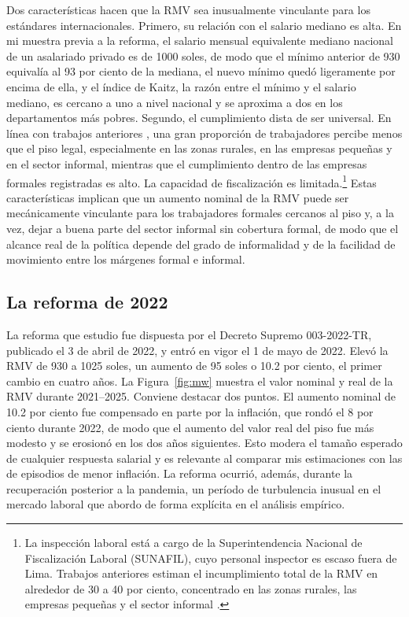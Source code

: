 Dos características hacen que la RMV sea inusualmente vinculante para los estándares internacionales. Primero, su relación con el salario mediano es alta. En mi muestra previa a la reforma, el salario mensual equivalente mediano nacional de un asalariado privado es de 1000 soles, de modo que el mínimo anterior de 930 equivalía al 93 por ciento de la mediana, el nuevo mínimo quedó ligeramente por encima de ella, y el índice de Kaitz, la razón entre el mínimo y el salario mediano, es cercano a uno a nivel nacional y se aproxima a dos en los departamentos más pobres. Segundo, el cumplimiento dista de ser universal. En línea con trabajos anteriores \citep{jaramillo_lopez_2006, cespedes_2005}, una gran proporción de trabajadores percibe menos que el piso legal, especialmente en las zonas rurales, en las empresas pequeñas y en el sector informal, mientras que el cumplimiento dentro de las empresas formales registradas es alto. La capacidad de fiscalización es limitada.\footnote{La inspección laboral está a cargo de la Superintendencia Nacional de Fiscalización Laboral (SUNAFIL), cuyo personal inspector es escaso fuera de Lima. Trabajos anteriores estiman el incumplimiento total de la RMV en alrededor de 30 a 40 por ciento, concentrado en las zonas rurales, las empresas pequeñas y el sector informal \citep{jaramillo_lopez_2006, cespedes_2005}.} Estas características implican que un aumento nominal de la RMV puede ser mecánicamente vinculante para los trabajadores formales cercanos al piso y, a la vez, dejar a buena parte del sector informal sin cobertura formal, de modo que el alcance real de la política depende del grado de informalidad y de la facilidad de movimiento entre los márgenes formal e informal.

\subsection{La reforma de 2022}

La reforma que estudio fue dispuesta por el Decreto Supremo 003-2022-TR, publicado el 3 de abril de 2022, y entró en vigor el 1 de mayo de 2022. Elevó la RMV de 930 a 1025 soles, un aumento de 95 soles o 10.2 por ciento, el primer cambio en cuatro años. La Figura~\ref{fig:mw} muestra el valor nominal y real de la RMV durante 2021--2025. Conviene destacar dos puntos. El aumento nominal de 10.2 por ciento fue compensado en parte por la inflación, que rondó el 8 por ciento durante 2022, de modo que el aumento del valor real del piso fue más modesto y se erosionó en los dos años siguientes. Esto modera el tamaño esperado de cualquier respuesta salarial y es relevante al comparar mis estimaciones con las de episodios de menor inflación. La reforma ocurrió, además, durante la recuperación posterior a la pandemia, un período de turbulencia inusual en el mercado laboral que abordo de forma explícita en el análisis empírico.

